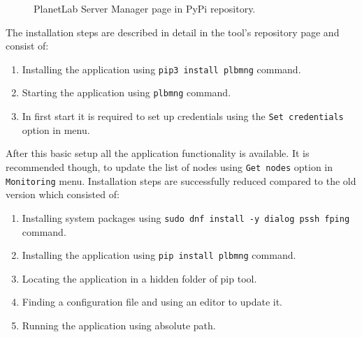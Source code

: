 \begin{figure}[H]
	\centering
	\caption{PlanetLab Server Manager page in PyPi repository.}
	\label{fig:plbmngrepo}
\end{figure}

The installation steps are described in detail in the tool's repository page and consist of:

\begin{enumerate}
	\item Installing the application using \texttt{pip3 install plbmng} command.
	\item Starting the application using \texttt{plbmng} command.
	\item In first start it is required to set up credentials using the \texttt{Set credentials} option in menu.
\end{enumerate}

After this basic setup all the application functionality is available. It is recommended though, to update the list of nodes using \texttt{Get nodes} option in \texttt{Monitoring} menu. Installation steps are successfully reduced compared to the old version which consisted of:

\begin{enumerate}
	\item Installing system packages using \texttt{sudo dnf install -y dialog pssh fping} command.
	\item Installing the application using \texttt{pip install plbmng} command.
	\item Locating the application in a hidden folder of pip tool.
	\item Finding a configuration file and using an editor to update it.
	\item Running the application using absolute path.
\end{enumerate}

